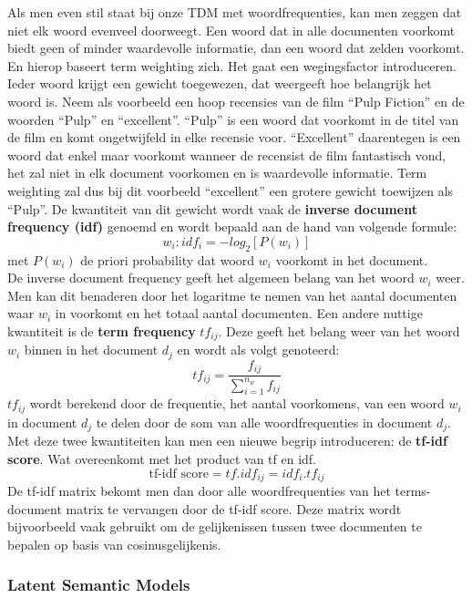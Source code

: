 Als men even stil staat bij onze TDM met woordfrequenties, kan men zeggen dat niet elk woord evenveel doorweegt. Een woord dat in alle documenten voorkomt biedt geen of minder waardevolle informatie, dan een woord dat zelden voorkomt. En hierop baseert term weighting zich. Het gaat een wegingsfactor introduceren. Ieder woord krijgt een gewicht toegewezen, dat weergeeft hoe belangrijk het woord is. Neem als voorbeeld een hoop recensies van de film ``Pulp Fiction'' en de woorden ``Pulp'' en ``excellent''. ``Pulp'' is een woord dat voorkomt in de titel van de film en komt ongetwijfeld in elke recensie voor. ``Excellent'' daarentegen is een woord dat enkel maar voorkomt wanneer de recensist de film fantastisch vond, het zal niet in elk document voorkomen en is waardevolle informatie. Term weighting zal dus bij dit voorbeeld ``excellent'' een grotere gewicht toewijzen als ``Pulp''. 
%
De kwantiteit van dit gewicht wordt vaak de \textbf{inverse document frequency  (idf)} genoemd en wordt bepaald aan de hand van volgende formule:
\[w_{i}: idf_{i} = -log_{2}[P(w_{i})] \]
met $P(w_{i})$ de priori probability dat woord $w_{i}$ voorkomt in het document.\\
%
De inverse document frequency geeft het algemeen belang van het woord $w_{i}$ weer. Men kan dit benaderen door het logaritme te nemen van het aantal documenten waar $w_{i}$ in voorkomt en het totaal aantal documenten.
Een andere nuttige kwantiteit is de  \textbf{term frequency} $tf_{ij}$. Deze geeft het belang weer van het woord $w_{i}$ binnen in het document $d_{j}$  en wordt als volgt genoteerd:
\[ tf_{ij} = \frac{f_{ij}}{ \sum_{i=1}^{n_{w}}f_{ij}} \]
%
$tf_{ij}$ wordt berekend door de frequentie, het aantal voorkomens, van een woord $w_{i}$ in document $d_{j}$ te delen door de som van alle woordfrequenties in document $d_{j}$.
Met deze twee kwantiteiten kan men een nieuwe begrip introduceren: de \textbf{tf-idf score}. Wat overeenkomt met het product van tf en idf.
\[ \text{tf-idf score} = tf . idf_{ij} = idf_{i} . tf_{ij} \]
%
De tf-idf matrix bekomt men dan door alle woordfrequenties van het terms-document matrix te vervangen door de tf-idf score.
Deze matrix wordt bijvoorbeeld vaak gebruikt om de gelijkenissen tussen twee documenten te bepalen op basis van cosinusgelijkenis.
%
\subsubsection{Latent Semantic Models}\label{Latent Semantic Models}

